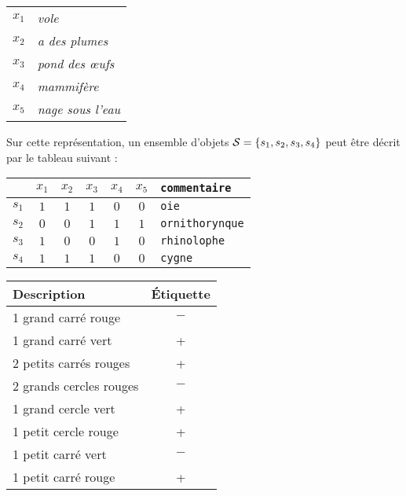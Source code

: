 \documentclass[a4paper, french]{article}
\begin{document}
\begin{center}
\begin{tabular}{rl}
$x_1$ &{\em vole}\\
$x_2$ &{\em a des plumes}\\
$x_3$ &{\em pond des \oe ufs}\\
$x_4$ &{\em mammif\`{e}re}\\
$x_5$ &{\em nage sous l'eau}\\
\end{tabular}
\end{center}

Sur cette représentation, un ensemble d'objets  ${\cal S} = \{s_1, s_2, s_3, s_4\}$ peut être décrit par le tableau suivant :


\begin{center}
\begin{tabular}{c||c|c|c|c|c||l}

& $x_1$ & $x_2$ & $x_3$ & $x_4$ & $x_5$ & {\tt commentaire}\\
 \hline \hline
$s_1$&$1$ &$1$ &$1$& $0$ & $0$&{\tt oie}\\
\hline
$s_2$&$0$ &$0$ &$1$& $1$ &$1$&{\tt ornithorynque}\\
\hline
$s_3$&$1$ &$0$ &$0$& $1$ &$0$&{\tt rhinolophe}\\
\hline
$s_4$&$1$ &$1$ &$1$& $0$& $0$&{\tt cygne}\\
\hline
\end{tabular}
\end{center}

\newpage
\begin{center}
\begin{tabular}{|l||c|}
\hline
Description & \'Etiquette \\
\hline \hline
1 grand carré rouge & $-$ \\
\hline
1 grand carré vert & + \\
\hline
2 petits carrés rouges & + \\
\hline
2 grands cercles rouges & $-$ \\
\hline
1 grand cercle vert & + \\
\hline
1 petit cercle rouge & + \\
\hline
1 petit carré vert & $-$ \\
\hline
1 petit carré rouge & + \\
\hline
\end{tabular}
\end{center}
\end{document}
